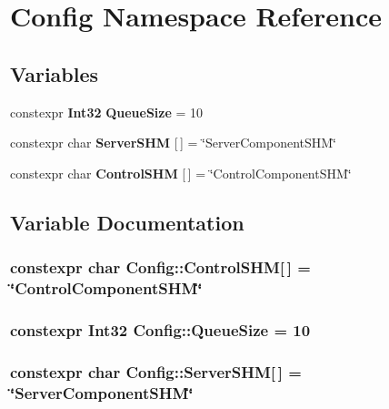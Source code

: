 \section{Config Namespace Reference}
\label{namespaceConfig}
\subsection*{Variables}
\begin{DoxyCompactItemize}
\item 
constexpr {\bf Int32} {\bf Queue\-Size} = 10
\item 
constexpr char {\bf Server\-S\-H\-M} [$\,$] = \char`\"{}Server\-Component\-S\-H\-M\char`\"{}
\item 
constexpr char {\bf Control\-S\-H\-M} [$\,$] = \char`\"{}Control\-Component\-S\-H\-M\char`\"{}
\end{DoxyCompactItemize}


\subsection{Variable Documentation}
\subsubsection[{Control\-S\-H\-M}]{\setlength{\rightskip}{0pt plus 5cm}constexpr char Config\-::\-Control\-S\-H\-M[$\,$] = \char`\"{}Control\-Component\-S\-H\-M\char`\"{}}\label{namespaceConfig_a88b374a14aa1eab6c02bdf92ccea1f00}
\subsubsection[{Queue\-Size}]{\setlength{\rightskip}{0pt plus 5cm}constexpr {\bf Int32} Config\-::\-Queue\-Size = 10}\label{namespaceConfig_a28c140a82bbfcca65bc0529ad68c5c52}
\subsubsection[{Server\-S\-H\-M}]{\setlength{\rightskip}{0pt plus 5cm}constexpr char Config\-::\-Server\-S\-H\-M[$\,$] = \char`\"{}Server\-Component\-S\-H\-M\char`\"{}}\label{namespaceConfig_a1008fd86268c2c132c7da1fb84474147}
